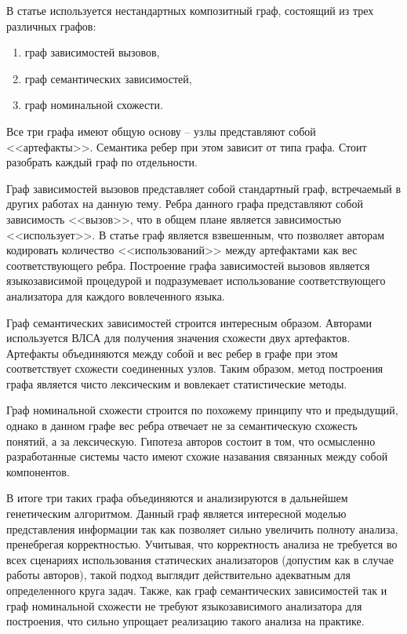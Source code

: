 В статье используется нестандартных композитный граф, состоящий из трех различных графов:
\begin{enumerate}[1)]
    \item граф зависимостей вызовов,
    \item граф семантических зависимостей,
    \item граф номинальной схожести.
\end{enumerate}
Все три графа имеют общую основу -- узлы представляют собой <<артефакты>>. Семантика ребер при этом зависит от типа графа.
Стоит разобрать каждый граф по отдельности.

Граф зависимостей вызовов представляет собой стандартный граф, встречаемый в других работах на данную тему. Ребра данного графа
представляют собой зависимость <<вызов>>, что в общем плане является зависимостью <<использует>>. В статье граф является взвешенным, что
позволяет авторам кодировать количество <<использований>> между артефактами как вес соответствующего ребра.
Построение графа зависимостей вызовов является языкозависимой процедурой и подразумевает использование соответствующего
анализатора для каждого вовлеченного языка.

Граф семантических зависимостей строится интересным образом. Авторами используется ВЛСА  для получения
значения схожести двух артефактов. Артефакты объединяются между собой и вес ребер в графе при этом соответствует схожести соединенных
узлов. Таким образом, метод построения графа является чисто лексическим и вовлекает статистические методы.

Граф номинальной схожести строится по похожему принципу что и предыдущий, однако в данном графе вес ребра отвечает не
за семантическую схожесть понятий, а за лексическую. Гипотеза авторов состоит в том, что осмысленно разработанные
системы часто имеют схожие назавания связанных между собой компонентов.

В итоге три таких графа объединяются и анализируются в дальнейшем генетическим алгоритмом. Данный граф
является интересной моделью представления информации так как позволяет сильно увеличить полноту анализа, пренебрегая
корректностью. Учитывая, что корректность анализа не требуется во всех сценариях использования статических анализаторов
(допустим как в случае работы авторов), такой подход выглядит действительно адекватным для определенного круга задач.
Также, как граф семантических зависимостей так и граф номинальной схожести не требуют языкозависимого анализатора для построения, что
сильно упрощает реализацию такого анализа на практике.

